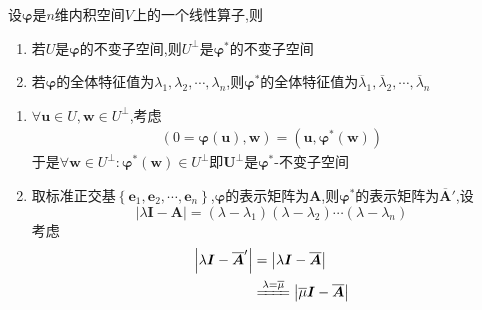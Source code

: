 \begin{formal}
    \begin{proposition}[伴随的不变子空间与特征值]\label{prop:伴随的不变子空间与特征值}
        设$\bm{\varphi}$是$n$维内积空间$V$上的一个线性算子,则\begin{enumerate}[label={\textup{(\arabic*)}}]
            \item 若$U$是$\bm{\varphi}$的不变子空间,则$U^{\perp}$是$\bm{\varphi}^*$的不变子空间
            \item 若$\bm{\varphi}$的全体特征值为$\lambda_1,\lambda_2,\cdots,\lambda_n$,则$\bm{\varphi}^*$的全体特征值为$\overline{\lambda}_1,\overline{\lambda}_2,\cdots,\overline{\lambda}_n$
        \end{enumerate}
    \end{proposition}
    \begin{Proof}
        \begin{enumerate}[label={\textup{(\arabic*)}}]
            \item $\forall\bm{u}\in U,\bm{w}\in U^{\perp}$,考虑\begin{align*}
                \left(
                    0=\bm{\varphi}\left(
                        \bm{u}
                    \right),\bm{w}
                \right)=\left(
                    \bm{u},\bm{\varphi}^*\left(
                        \bm{w}
                    \right)
                \right)
            \end{align*}于是$\forall\bm{w}\in U^{\perp}:\bm{\varphi}^*\left(\bm{w}\right)\in U^{\perp}$即$\bm{U}^{\perp}$是$\bm{\varphi}^*$-不变子空间
            \item 取标准正交基$\left\{
                \bm{e}_1,\bm{e}_2,\cdots,\bm{e}_n
            \right\}$,$\bm{\varphi}$的表示矩阵为$\bm{A}$,则$\bm{\varphi}^*$的表示矩阵为$\overline{\bm{A}}'$,设\[
            \left|
                \lambda\bm{I}-\bm{A}
            \right|=\left(
                \lambda-\lambda_1
            \right)\left(
                \lambda-\lambda_2
            \right)\cdots\left(
                \lambda-\lambda_n
            \right)
            \]考虑\begin{align*}
                \left|
                    \lambda\bm{I}-\overline{\bm{A}}'
                \right|&=\left|
                    \lambda\bm{I}-\overline{\bm{A}}
                \right|\\
                &\xlongequal{\lambda=\overline{\mu}}\left|
                    \overline{\mu}\bm{I}-\overline{\bm{A}}
                \right|\\

\end{align*}
\end{enumerate}
\end{Proof}
\end{formal}
